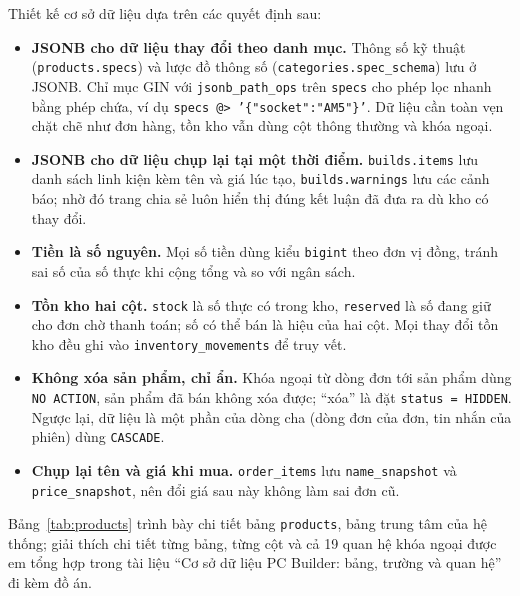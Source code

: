 Thiết kế cơ sở dữ liệu dựa trên các quyết định sau:
\begin{itemize}
  \item \textbf{JSONB cho dữ liệu thay đổi theo danh mục.} Thông số kỹ thuật (\texttt{products.specs}) và lược đồ thông số (\texttt{categories.spec\_schema}) lưu ở JSONB. Chỉ mục GIN với \texttt{jsonb\_path\_ops} trên \texttt{specs} cho phép lọc nhanh bằng phép chứa, ví dụ \texttt{specs @> '\{"socket":"AM5"\}'}. Dữ liệu cần toàn vẹn chặt chẽ như đơn hàng, tồn kho vẫn dùng cột thông thường và khóa ngoại.
  \item \textbf{JSONB cho dữ liệu chụp lại tại một thời điểm.} \texttt{builds.items} lưu danh sách linh kiện kèm tên và giá lúc tạo, \texttt{builds.warnings} lưu các cảnh báo; nhờ đó trang chia sẻ luôn hiển thị đúng kết luận đã đưa ra dù kho có thay đổi.
  \item \textbf{Tiền là số nguyên.} Mọi số tiền dùng kiểu \texttt{bigint} theo đơn vị đồng, tránh sai số của số thực khi cộng tổng và so với ngân sách.
  \item \textbf{Tồn kho hai cột.} \texttt{stock} là số thực có trong kho, \texttt{reserved} là số đang giữ cho đơn chờ thanh toán; số có thể bán là hiệu của hai cột. Mọi thay đổi tồn kho đều ghi vào \texttt{inventory\_movements} để truy vết.
  \item \textbf{Không xóa sản phẩm, chỉ ẩn.} Khóa ngoại từ dòng đơn tới sản phẩm dùng \texttt{NO ACTION}, sản phẩm đã bán không xóa được; ``xóa'' là đặt \texttt{status = HIDDEN}. Ngược lại, dữ liệu là một phần của dòng cha (dòng đơn của đơn, tin nhắn của phiên) dùng \texttt{CASCADE}.
  \item \textbf{Chụp lại tên và giá khi mua.} \texttt{order\_items} lưu \texttt{name\_snapshot} và \texttt{price\_snapshot}, nên đổi giá sau này không làm sai đơn cũ.
\end{itemize}

Bảng~\ref{tab:products} trình bày chi tiết bảng \texttt{products}, bảng trung tâm của hệ thống; giải thích chi tiết từng bảng, từng cột và cả 19 quan hệ khóa ngoại được em tổng hợp trong tài liệu ``Cơ sở dữ liệu PC Builder: bảng, trường và quan hệ'' đi kèm đồ án.


